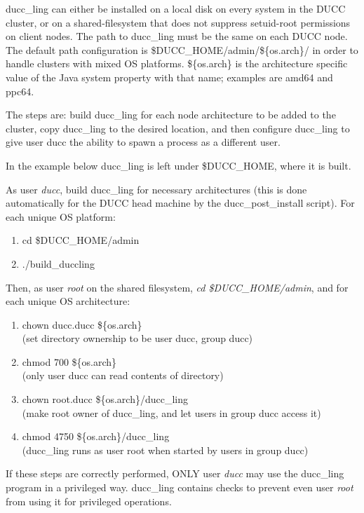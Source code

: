     ducc\_ling can either be installed on a local disk on every system in the DUCC cluster, 
    or on a shared-filesystem that does not suppress setuid-root permissions on client nodes.
    The path to ducc\_ling must be the same on each DUCC node. 
    The default path configuration is
    \${DUCC\_HOME}/admin/\$\{os.arch\}/ in order to handle clusters with mixed OS platforms.
    \$\{os.arch\} is the architecture specific value of the Java system property with that name;
    examples are amd64 and ppc64.
   
	The steps are: build ducc\_ling for each node architecture to be added to the cluster,
	copy ducc\_ling to the desired location, and then configure ducc\_ling to give user
	ducc the ability to spawn a process as a different user.

    In the example below ducc\_ling is left under \$DUCC\_HOME, where it is built.

    As user {\em ducc}, build ducc\_ling for necessary architectures (this is done
    automatically for the DUCC head machine by the ducc\_post\_install script).
    For each unique OS platform:
    \begin{enumerate}
        \item cd \$DUCC\_HOME/admin
        \item ./build\_duccling
     \end{enumerate}

     Then, as user {\em root} on the shared filesystem, {\em cd \$DUCC\_HOME/admin}, and for each unique OS architecture:
     \begin{enumerate}
        \item chown ducc.ducc \$\{os.arch\}
        \\ (set directory ownership to be user ducc, group ducc)
        \item chmod 700 \$\{os.arch\}
        \\ (only user ducc can read contents of directory)
        \item chown root.ducc \$\{os.arch\}/ducc\_ling
        \\ (make root owner of ducc\_ling, and let users in group ducc access it)
        \item chmod 4750 \$\{os.arch\}/ducc\_ling
        \\ (ducc\_ling runs as user root when started by users in group ducc)
     \end{enumerate}
          
If these steps are correctly performed, ONLY user {\em ducc} may use the ducc\_ling program in
a privileged way. ducc\_ling contains checks to prevent even user {\em root} from using it for
privileged operations.

